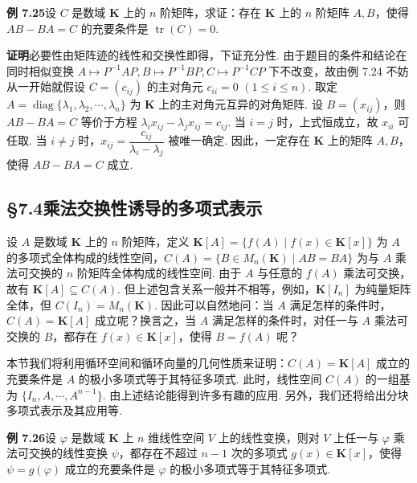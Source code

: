 \documentclass[UTF8,12pt,a4paper,fontset=fandol]{ctexart}
\begin{document}
\noindent\textbf{例 7.25}\quad 设 $C$ 是数域 $\mathbf{K}$ 上的 $n$ 阶矩阵，求证：存在 $\mathbf{K}$ 上的 $n$ 阶矩阵 $A,B$，使得 $AB-BA=C$ 的充要条件是 $\operatorname{tr}(C)=0$.

\noindent\textbf{证明}\quad 必要性由矩阵迹的线性和交换性即得，下证充分性. 由于题目的条件和结论在同时相似变换 $A\mapsto P^{-1}AP,B\mapsto P^{-1}BP,C\mapsto P^{-1}CP$ 下不改变，故由例 7.24 不妨从一开始就假设 $C=(c_{ij})$ 的主对角元 $c_{ii}=0$ $(1\le i\le n)$. 取定 $A=\operatorname{diag}\{\lambda_1,\lambda_2,\cdots,\lambda_n\}$ 为 $\mathbf{K}$ 上的主对角元互异的对角矩阵. 设 $B=(x_{ij})$，则 $AB-BA=C$ 等价于方程 $\lambda_ix_{ij}-\lambda_jx_{ij}=c_{ij}$. 当 $i=j$ 时，上式恒成立，故 $x_{ii}$ 可任取. 当 $i\ne j$ 时，$x_{ij}=\dfrac{c_{ij}}{\lambda_i-\lambda_j}$ 被唯一确定. 因此，一定存在 $\mathbf{K}$ 上的矩阵 $A,B$，使得 $AB-BA=C$ 成立.

\subsection*{§7.4\quad 乘法交换性诱导的多项式表示}

设 $A$ 是数域 $\mathbf{K}$ 上的 $n$ 阶矩阵，定义 $\mathbf{K}[A]=\{f(A)\mid f(x)\in\mathbf{K}[x]\}$ 为 $A$ 的多项式全体构成的线性空间，$C(A)=\{B\in M_n(\mathbf{K})\mid AB=BA\}$ 为与 $A$ 乘法可交换的 $n$ 阶矩阵全体构成的线性空间. 由于 $A$ 与任意的 $f(A)$ 乘法可交换，故有 $\mathbf{K}[A]\subseteq C(A)$. 但上述包含关系一般并不相等，例如，$\mathbf{K}[I_n]$ 为纯量矩阵全体，但 $C(I_n)=M_n(\mathbf{K})$. 因此可以自然地问：当 $A$ 满足怎样的条件时，$C(A)=\mathbf{K}[A]$ 成立呢？换言之，当 $A$ 满足怎样的条件时，对任一与 $A$ 乘法可交换的 $B$，都存在 $f(x)\in\mathbf{K}[x]$，使得 $B=f(A)$ 呢？

本节我们将利用循环空间和循环向量的几何性质来证明：$C(A)=\mathbf{K}[A]$ 成立的充要条件是 $A$ 的极小多项式等于其特征多项式. 此时，线性空间 $C(A)$ 的一组基为 $\{I_n,A,\cdots,A^{n-1}\}$. 由上述结论能得到许多有趣的应用. 另外，我们还将给出分块多项式表示及其应用等.

\noindent\textbf{例 7.26}\quad 设 $\varphi$ 是数域 $\mathbf{K}$ 上 $n$ 维线性空间 $V$ 上的线性变换，则对 $V$ 上任一与 $\varphi$ 乘法可交换的线性变换 $\psi$，都存在不超过 $n-1$ 次的多项式 $g(x)\in\mathbf{K}[x]$，使得 $\psi=g(\varphi)$ 成立的充要条件是 $\varphi$ 的极小多项式等于其特征多项式.
\end{document}
